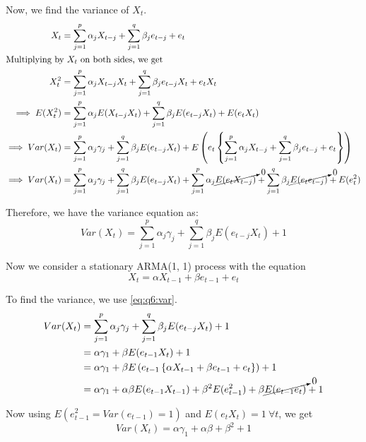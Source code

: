 \documentclass[12pt, oneside]{article}
\begin{document}
\begin{enumerate}
{    Now, we find the variance of \(X_t\).
    \begin{align*}
        X_t &= \sum_{j=1}^{p}\alpha_j X_{t-j} + \sum_{j=1}^{q} \beta_j e_{t-j} + e_t \\
        \intertext{Multiplying by \(X_t\) on both sides, we get}
        X_t^2 &= \sum_{j=1}^{p}\alpha_j X_{t-j} X_t + \sum_{j=1}^{q} \beta_j e_{t-j} X_t + e_t X_t \\
        \implies E(X_t^2) &= \sum_{j=1}^{p}\alpha_j E(X_{t-j} X_t) + \sum_{j=1}^{q} \beta_j E(e_{t-j} X_t) + E(e_t X_t) \\
        \implies Var(X_t) &= \sum_{j=1}^{p}\alpha_j \gamma_j + \sum_{j=1}^{q} \beta_j E(e_{t-j} X_t) + E\left(e_t \left\{\sum_{j=1}^{p}\alpha_j X_{t-j} + \sum_{j=1}^{q} \beta_j e_{t-j} + e_t\right\}\right) \\
        \implies Var(X_t) &= \sum_{j=1}^{p}\alpha_j \gamma_j + \sum_{j=1}^{q} \beta_j E(e_{t-j} X_t) + \sum_{j=1}^{p}\alpha_j \cancelto{0}{E(e_t X_{t-j})} + \sum_{j=1}^{q} \beta_j \cancelto{0}{E(e_t e_{t-j})} + E(e_t^2)
    \end{align*}
    
    Therefore, we have the variance equation as:
    \begin{equation}
        Var(X_t) = \sum_{j=1}^{p}\alpha_j \gamma_j + \sum_{j=1}^{q} \beta_j E(e_{t-j} X_t) + 1 \label{eq:q6:var}
    \end{equation}

    Now we consider a stationary ARMA(1, 1) process with the equation
    \[X_t = \alpha X_{t-1} + \beta e_{t-1} + e_t\]

    To find the variance, we use \eqref{eq:q6:var}.
    \begin{align*}
        Var(X_t) &= \sum_{j=1}^{p}\alpha_j \gamma_j + \sum_{j=1}^{q} \beta_j E(e_{t-j} X_t) + 1 \\
            &= \alpha \gamma_1 + \beta E(e_{t-1} X_t) + 1 \\
            &= \alpha \gamma_1 + \beta E\left(e_{t-1} \left\{\alpha X_{t-1} + \beta e_{t-1} + e_t\right\} \right) + 1 \\
            &= \alpha \gamma_1 + \alpha \beta E(e_{t-1} X_{t-1}) + \beta^2 E(e_{t-1}^2) + \beta \cancelto{0}{E(e_{t-1} e_t)} + 1
    \end{align*}

    Now using \(E(e_{t-1}^2 = Var(e_{t-1}) = 1)\) and \(E(e_t X_t) = 1 ~\forall t\), we get
    \begin{equation}
        Var(X_t) = \alpha \gamma_1 + \alpha \beta + \beta^2 + 1 \label{eq:q6:var_calc}
    \end{equation}

}
\end{enumerate}
\end{document}
